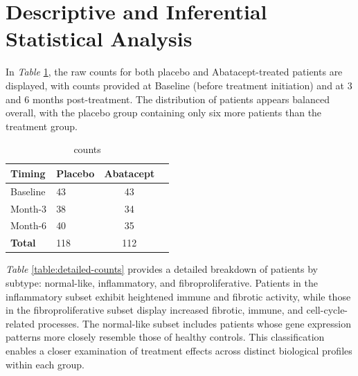 \documentclass{report}
\begin{document}
\section{Descriptive and Inferential Statistical Analysis}

In \textit{Table} \ref{table:count}, the raw counts for both placebo and Abatacept-treated patients are displayed, with counts provided at Baseline (before treatment initiation) and at 3 and 6 months post-treatment. The distribution of patients appears balanced overall, with the placebo group containing only six more patients than the treatment group.

\begin{table}[!ht]
	\centering
	\begin{tabular}{|l|l|c|c}
		\hline
		\textbf{Timing} & \textbf{Placebo} & \textbf{Abatacept} \\ \hline
		Baseline & 43 & 43 \\ 
		Month-3 & 38 & 34 \\ 
		Month-6 & 40 & 35 \\ \hline
		\textbf{Total} & 118 & 112 \\ \hline
	\end{tabular}
	\caption{counts}
	\label{table:count}
\end{table}

\textit{Table} \ref{table:detailed-counts} provides a detailed breakdown of patients by subtype: normal-like, inflammatory, and fibroproliferative. Patients in the inflammatory subset exhibit heightened immune and fibrotic activity, while those in the fibroproliferative subset display increased fibrotic, immune, and cell-cycle-related processes. The normal-like subset includes patients whose gene expression patterns more closely resemble those of healthy controls. This classification enables a closer examination of treatment effects across distinct biological profiles within each group.
\end{document}
